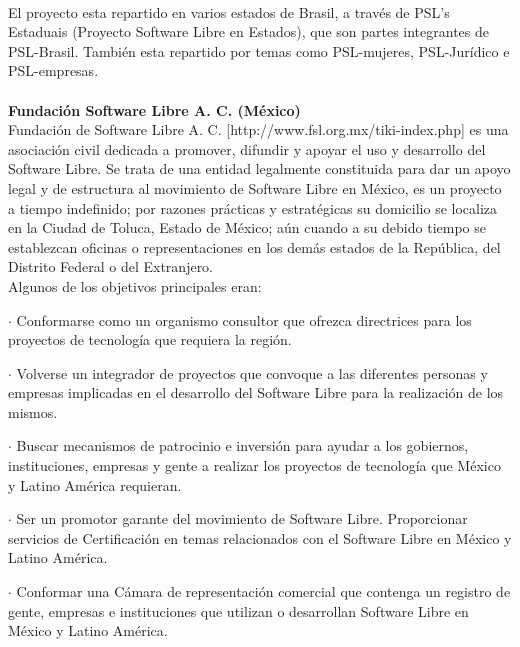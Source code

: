 \\
El proyecto esta repartido en varios estados de Brasil, a través de PSL's Estaduais (Proyecto Software Libre en Estados), que son partes integrantes de PSL-Brasil. También esta repartido por temas como PSL-mujeres, PSL-Jurídico e PSL-empresas.
\\
\\
{\bf Fundación Software Libre A. C. (México)}
\\
Fundación de Software Libre A. C. [http://www.fsl.org.mx/tiki-index.php] es una asociación civil dedicada a promover, difundir y apoyar el uso y desarrollo del Software Libre. Se trata de una entidad legalmente constituida para dar un apoyo legal y de estructura al movimiento de Software Libre en México, es un proyecto a tiempo indefinido; por razones prácticas y estratégicas su domicilio se localiza en la Ciudad de Toluca, Estado de México; aún cuando a su debido tiempo se establezcan oficinas o representaciones en los demás estados de la República, del Distrito Federal o del Extranjero.
\\
Algunos de los objetivos principales eran:

\begin{description}
\item $\cdot$ Conformarse como un organismo consultor que ofrezca directrices para los proyectos de tecnología que requiera la región.
\item $\cdot$ Volverse un integrador de proyectos que convoque a las diferentes personas y empresas implicadas en el desarrollo del Software Libre para la realización de los mismos.
\item $\cdot$ Buscar mecanismos de patrocinio e inversión para ayudar a los gobiernos, instituciones, empresas y gente a realizar los proyectos de tecnología que México y Latino América requieran.
\item $\cdot$ Ser un promotor garante del movimiento de Software Libre. Proporcionar servicios de Certificación en temas relacionados con el Software Libre en México y Latino América.
\item $\cdot$ Conformar una Cámara de representación comercial que contenga un registro de gente, empresas e instituciones que utilizan o desarrollan Software Libre en México y Latino América.
\end{description}

